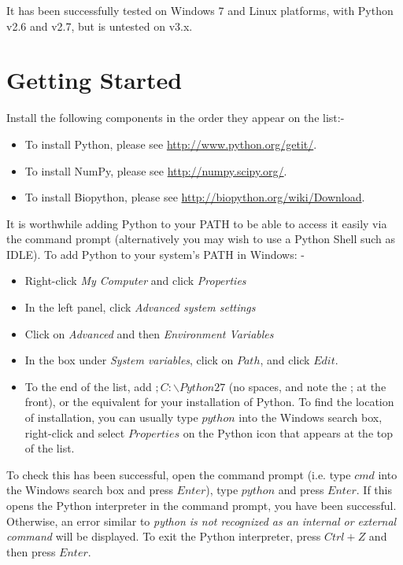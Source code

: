 \documentclass[10pt]{article}
\begin{document}
It has been successfully tested on Windows 7 and Linux platforms, with Python v2.6 and v2.7, but is untested on v3.x.

\section*{Getting Started}
Install the following components in the order they appear on the list:-
\begin{itemize}
\item To install Python, please see \url{http://www.python.org/getit/}.
\item To install NumPy, please see \url{http://numpy.scipy.org/}.
\item To install Biopython, please see \url{http://biopython.org/wiki/Download}.
\end{itemize}

It is worthwhile adding Python to your PATH to be able to access it easily via the command prompt (alternatively you may wish to use a Python Shell such as IDLE). To add Python to your system's PATH in Windows: -

\begin{itemize}
\item Right-click \emph{My Computer} and click \emph{Properties}
\item In the left panel, click \emph{Advanced system settings}
\item Click on \emph{Advanced} and then \emph{Environment Variables}
\item In the box under \emph{System variables}, click on $Path$, and click $Edit$.
\item To the end of the list, add $;C:\backslash Python27$ (no spaces, and note the ; at the front), or the equivalent for your installation of Python. To find the location of installation, you can usually type $python$ into the Windows search box, right-click and select $Properties$ on the Python icon that appears at the top of the list.
\end{itemize}
To check this has been successful, open the command prompt (i.e. type $cmd$ into the Windows search box and press $Enter$), type $python$ and press $Enter$. If this opens the Python interpreter in the command prompt, you have been successful. Otherwise, an error similar to \emph{python is not recognized as an internal or external command} will be displayed. To exit the Python interpreter, press $Ctrl+Z$ and then press $Enter$.
\end{document}
